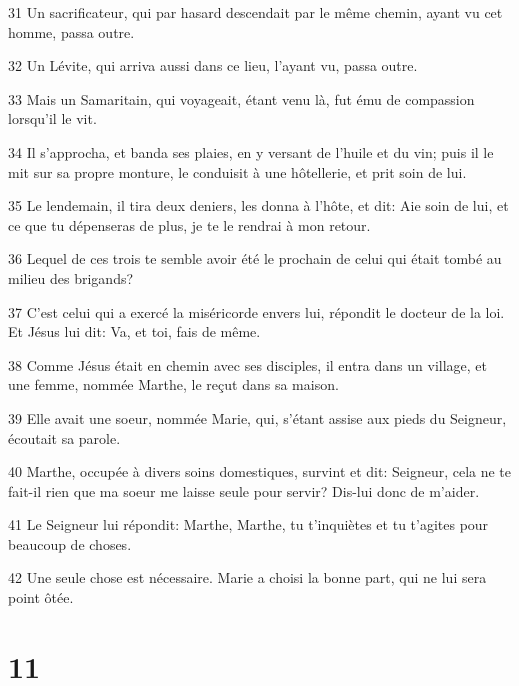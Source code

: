 \par 31 Un sacrificateur, qui par hasard descendait par le même chemin, ayant vu cet homme, passa outre.
\par 32 Un Lévite, qui arriva aussi dans ce lieu, l'ayant vu, passa outre.
\par 33 Mais un Samaritain, qui voyageait, étant venu là, fut ému de compassion lorsqu'il le vit.
\par 34 Il s'approcha, et banda ses plaies, en y versant de l'huile et du vin; puis il le mit sur sa propre monture, le conduisit à une hôtellerie, et prit soin de lui.
\par 35 Le lendemain, il tira deux deniers, les donna à l'hôte, et dit: Aie soin de lui, et ce que tu dépenseras de plus, je te le rendrai à mon retour.
\par 36 Lequel de ces trois te semble avoir été le prochain de celui qui était tombé au milieu des brigands?
\par 37 C'est celui qui a exercé la miséricorde envers lui, répondit le docteur de la loi. Et Jésus lui dit: Va, et toi, fais de même.
\par 38 Comme Jésus était en chemin avec ses disciples, il entra dans un village, et une femme, nommée Marthe, le reçut dans sa maison.
\par 39 Elle avait une soeur, nommée Marie, qui, s'étant assise aux pieds du Seigneur, écoutait sa parole.
\par 40 Marthe, occupée à divers soins domestiques, survint et dit: Seigneur, cela ne te fait-il rien que ma soeur me laisse seule pour servir? Dis-lui donc de m'aider.
\par 41 Le Seigneur lui répondit: Marthe, Marthe, tu t'inquiètes et tu t'agites pour beaucoup de choses.
\par 42 Une seule chose est nécessaire. Marie a choisi la bonne part, qui ne lui sera point ôtée.

\chapter{11}

